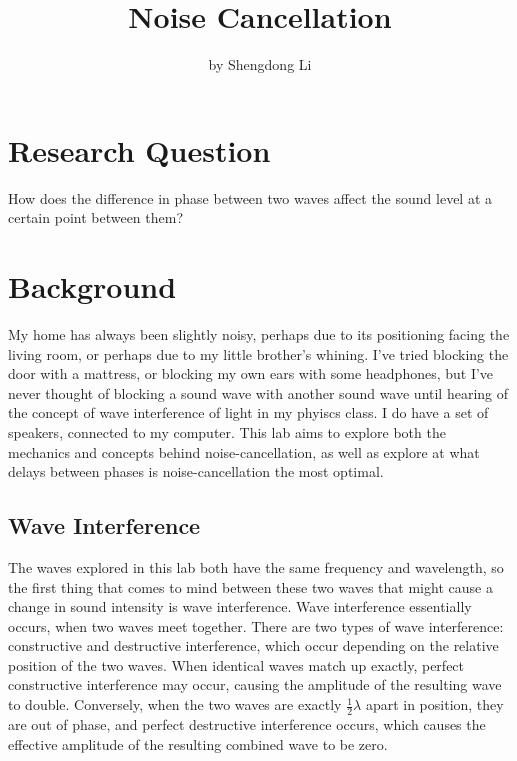 \documentclass[index]{subfiles}
\begin{document}
\title{Noise Cancellation}
\author{by Shengdong Li}
\maketitle

\section{Research Question}

How does the difference in phase between two waves affect the sound level at a certain point between them?

\section{Background}

My home has always been slightly noisy, perhaps due to its positioning facing the living room, or perhaps due to my little brother's whining. I've tried blocking the door with a mattress, or blocking my own ears with some headphones, but I've never thought of blocking a sound wave with another sound wave until hearing of the concept of wave interference of light in my phyiscs class. I do have a set of speakers, connected to my computer. This lab aims to explore both the mechanics and concepts behind noise-cancellation, as well as explore at what delays between phases is noise-cancellation the most optimal.

\subsection{Wave Interference}

The waves explored in this lab both have the same frequency and wavelength, so the first thing that comes to mind between these two waves that might cause a change in sound intensity is wave interference.
Wave interference essentially occurs, when two waves meet together. There are two types of wave interference: constructive and destructive interference, which occur depending on the relative position of the two waves. When identical waves match up exactly, perfect constructive interference may occur, causing the amplitude of the resulting wave to double. Conversely, when the two waves are exactly \(\frac{1}{2}\lambda\) apart in position, they are out of phase, and perfect destructive interference occurs, which causes the effective amplitude of the resulting combined wave to be zero. \cite{openstax}
\end{document}
